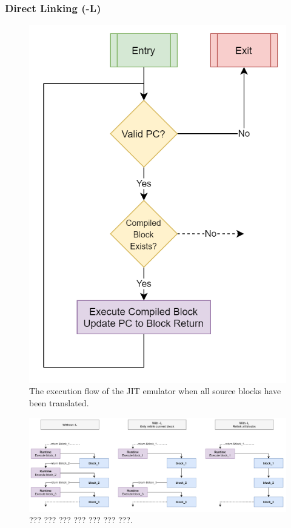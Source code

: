 \subsubsection{Direct Linking (-L)}

\begin{figure}[h]
    \centering
    \includegraphics[width=0.5\linewidth]{diagrams/jit-steady.png}
    \caption{The execution flow of the JIT emulator when all source blocks have been translated.}
    \label{figure:jit-steady}
\end{figure}

\begin{figure}[h]
    \centering
    \includegraphics[width=1\linewidth]{diagrams/relinking.png}
    \caption{??? ??? ??? ??? ??? ??? ???.}
    \label{figure:relinking}
\end{figure}